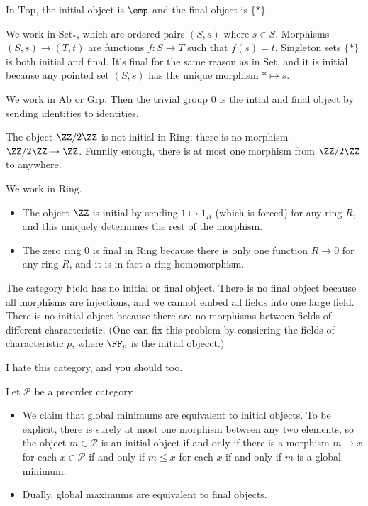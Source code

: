 \begin{example}
	In $\mathrm{Top}$, the initial object is $\emp$ and the final object is $\{*\}$.
\end{example}
\begin{example}
	We work in $\mathrm{Set}_*$, which are ordered pairs $(S,s)$ where $s\in S$. Morphisms $(S,s)\to(T,t)$ are functions $f:S\to T$ such that $f(s)=t$. Singleton sets $\{*\}$ is both initial and final. It's final for the same reason as in $\mathrm{Set}$, and it is initial because any pointed set $(S,s)$ has the unique morphism $*\mapsto s$.
\end{example}
\begin{example}
	We work in $\mathrm{Ab}$ or $\mathrm{Grp}$. Then the trivial group $0$ is the intial and final object by sending identities to identities.
\end{example}
\begin{nex}
	The object $\ZZ/2\ZZ$ is not initial in $\mathrm{Ring}$: there is no morphism $\ZZ/2\ZZ\to\ZZ$. Funnily enough, there is at most one morphism from $\ZZ/2\ZZ$ to anywhere.
\end{nex}
\begin{nex}
	We work in $\mathrm{Ring}$.
	\begin{itemize}
		\item The object $\ZZ$ is initial by sending $1\mapsto1_R$ (which is forced) for any ring $R$, and this uniquely determines the rest of the morphism.
		\item The zero ring $0$ is final in $\mathrm{Ring}$ because there is only one function $R\to0$ for any ring $R$, and it is in fact a ring homomorphism.
	\end{itemize}
\end{nex}
\begin{example}
	The category $\mathrm{Field}$ has no initial or final object. There is no final object because all morphisms are injections, and we cannot embed all fields into one large field. There is no initial object because there are no morphisms between fields of different characteristic. (One can fix this problem by consiering the fields of characteristic $p$, where $\FF_p$ is the initial objecct.)
\end{example}
\begin{quot}
	I hate this category, and you should too.
\end{quot}
\begin{example}
	Let $\mathcal P$ be a preorder category.
	\begin{itemize}
		\item We claim that global minimums are equivalent to initial objects. To be explicit, there is surely at most one morphism between any two elements, so the object $m\in\mathcal P$ is an initial object if and only if there is a morphism $m\to x$ for each $x\in\mathcal P$ if and only if $m\le x$ for each $x$ if and only if $m$ is a global minimum.
		\item Dually, global maximums are equivalent to final objects.
	\end{itemize}
\end{example}
